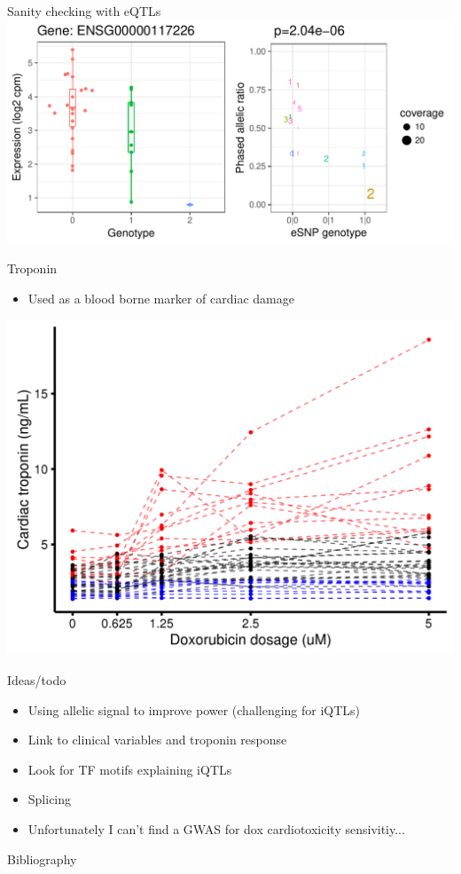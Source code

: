\documentclass{beamer}
\begin{document}
\begin{frame}{Sanity checking with eQTLs}
\includegraphics[page=20,width=\textwidth,clip,trim=0 0 0 0]{../figures/phasing_vs_eQTL.pdf}
\end{frame}

\begin{frame}{Troponin}
\begin{itemize}
\item Used as a blood borne marker of cardiac damage
\end{itemize}
\centering
\includegraphics[width=\textwidth,clip,trim=0 0 0 0]{../figures/troponin.png}
\end{frame}

\begin{frame}{Ideas/todo}
\begin{itemize}
\item Using allelic signal to improve power (challenging for iQTLs)
\item Link to clinical variables and troponin response
\item Look for TF motifs explaining iQTLs
\item Splicing
\item Unfortunately I can't find a GWAS for dox cardiotoxicity sensivitiy...
\end{itemize}
\end{frame}

\begin{frame}[allowframebreaks]{Bibliography}
\small
\def\newblock{}


\end{frame}
\end{document}

